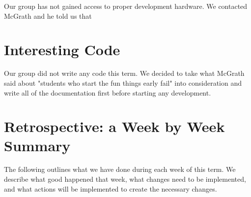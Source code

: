 \documentclass[onecolumn, draftclsnofoot,10pt, compsoc]{IEEEtran}
\begin{document}
Our group has not gained access to proper development hardware. We contacted McGrath and he told us that 

\section{Interesting Code}
Our group did not write any code this term. We decided to take what McGrath said about "students who start the fun things early fail" into consideration and write all of the documentation first before starting any development.

\section{Retrospective: a Week by Week Summary}

The following outlines what we have done during each week of this term. We describe what good happened that week, what changes need to be implemented, and what actions will be implemented to create the necessary changes.
\end{document}

